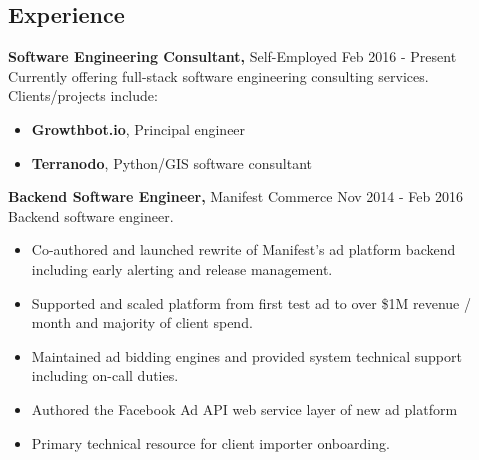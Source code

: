 \documentclass[margin]{res}
\begin{document}
 
 
\address{{\bf Current Address} \\ 1497 Hopkins St. Apt 3C\\ Berkekley, CA 94707}
\address{{\bf Contact Information} \\ Mobile: \space \space (724) VAN-VEEN \\Email: \space \space \space michael@mvanveen.net\\Website: \space mvv.io\\
Github: \space \space github.com/mvanveen} 
\begin{resume} 
 
\section{Experience}

  {\bf Software Engineering Consultant,} Self-Employed   \hfill Feb 2016 - Present \\
    Currently offering full-stack software engineering consulting services. \\
    Clients/projects include:
    \begin{itemize}
    \item {\bf Growthbot.io}, Principal engineer
    \item {\bf Terranodo}, Python/GIS software consultant
    \end{itemize}

  {\bf Backend Software Engineer,} Manifest Commerce \hfill Nov 2014 - Feb 2016\\
  Backend software engineer.
  \begin{itemize}
    \item Co-authored and launched rewrite of Manifest's ad platform backend including early alerting and release management.
    \item Supported and scaled platform from first test ad to over \$1M revenue / month and majority of client spend.
    \item Maintained ad bidding engines and provided system technical support including on-call duties.
    \item Authored the Facebook Ad API web service layer of new ad platform
    \item Primary technical resource for client importer onboarding.
  \end{itemize}


\end{resume}
\end{document}
